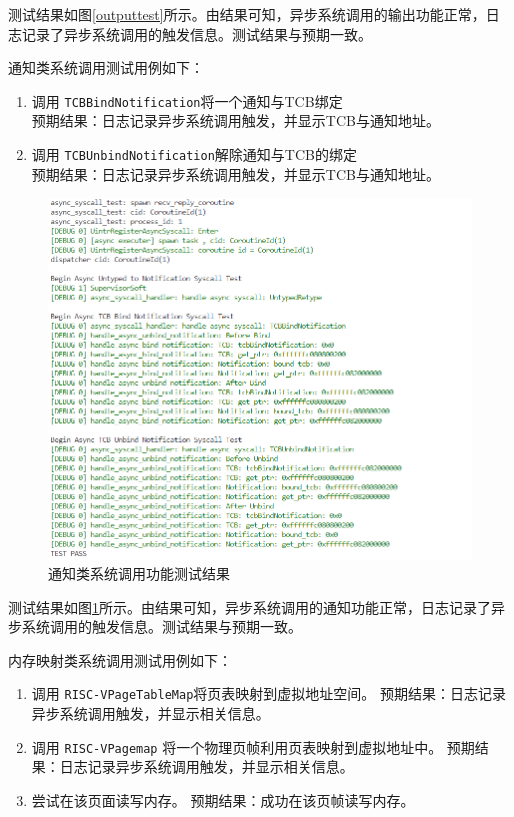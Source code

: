 测试结果如图\ref{outputtest}所示。由结果可知，异步系统调用的输出功能正常，日志记录了异步系统调用的触发信息。测试结果与预期一致。

通知类系统调用测试用例如下：

\begin{enumerate}
  \item 调用 \texttt{TCBBindNotification}将一个通知与TCB绑定\\
        预期结果：日志记录异步系统调用触发，并显示TCB与通知地址。
  \item 调用 \texttt{TCBUnbindNotification}解除通知与TCB的绑定\\
        预期结果：日志记录异步系统调用触发，并显示TCB与通知地址。
\end{enumerate}

\begin{figure}[htbp]
  \centering
  \includegraphics[width=\textwidth]{images/ntfntest.png}
  \caption{通知类系统调用功能测试结果}\label{ntfntest}
\end{figure}

测试结果如图\ref{ntfntest}所示。由结果可知，异步系统调用的通知功能正常，日志记录了异步系统调用的触发信息。测试结果与预期一致。

内存映射类系统调用测试用例如下：
\begin{enumerate}
  \item 调用 \texttt{RISC-VPageTableMap}将页表映射到虚拟地址空间。
        预期结果：日志记录异步系统调用触发，并显示相关信息。
  \item 调用 \texttt{RISC-VPagemap} 将一个物理页帧利用页表映射到虚拟地址中。
        预期结果：日志记录异步系统调用触发，并显示相关信息。
  \item 尝试在该页面读写内存。
        预期结果：成功在该页帧读写内存。
\end{enumerate}


